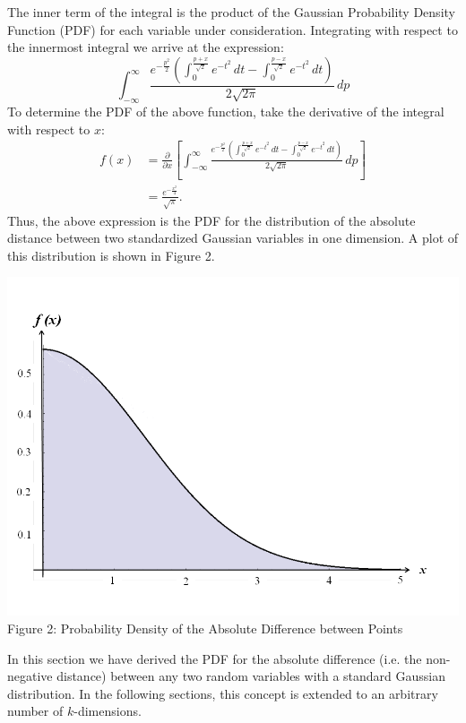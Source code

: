 \documentclass[11pt]{article} %
\begin{document}
\indent
The inner term of the integral is the product of the Gaussian Probability Density Function (PDF) for each variable under consideration.  Integrating with respect to the innermost integral we arrive at the expression:
%
$$\int_{-\infty }^{\infty } \frac{e^{-\frac{p^2}{2}} \left(\int_0^{\frac{p+x}{\sqrt{2}}} e^{-t^2}
   \, dt-\int_0^{\frac{p-x}{\sqrt{2}}} e^{-t^2} \, dt\right)}{2 \sqrt{2 \pi }} \, dp$$
%
\indent
To determine the PDF of the above function, take the derivative of the integral with respect to $x$: %
\begin{align*}
f(x) &= \frac{\partial}{\partial x}\left[\int_{-\infty }^{\infty } \frac{e^{-\frac{p^2}{2}} \left(\int_0^{\frac{p+x}{\sqrt{2}}} e^{-t^2}
   \, dt-\int_0^{\frac{p-x}{\sqrt{2}}} e^{-t^2} \, dt\right)}{2 \sqrt{2 \pi }} \, dp\right] \\
&= \frac{e^{-\frac{x^2}{4}}}{\sqrt{\pi }}.
\end{align*}
\indent
Thus, the above expression is the PDF for the distribution of the absolute distance between two standardized Gaussian variables in one dimension.  A plot of this distribution is shown in Figure 2.
\begin{center}
\includegraphics[scale=0.3]{Slide2.png} \\
Figure 2: Probability Density of the Absolute Difference between Points
\end{center}

\indent
In this section we have derived the PDF for the absolute difference (i.e. the non-negative distance) between any two random variables with a standard Gaussian distribution.  In the following sections, this concept is extended to an arbitrary number of $k$-dimensions.
%
\end{document}
